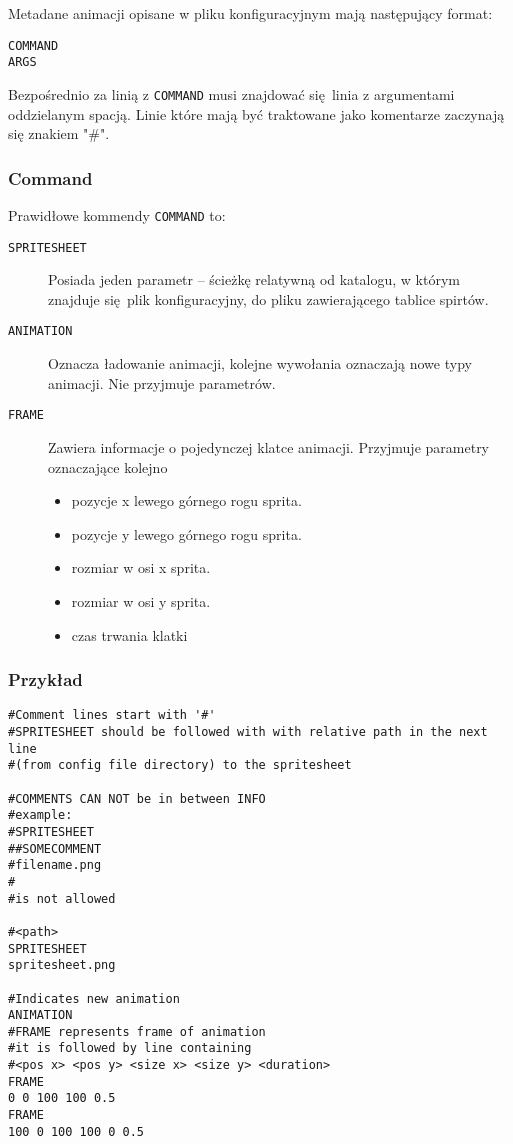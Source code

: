 \documentclass[11pt]{article}
\begin{document}
Metadane animacji opisane w pliku konfiguracyjnym mają następujący format:

\begin{verbatim}
COMMAND
ARGS
\end{verbatim}

Bezpośrednio za linią z \texttt{COMMAND} musi znajdować się linia z argumentami oddzielanym spacją.
Linie które mają być traktowane jako komentarze zaczynają się znakiem "\#".
\subsubsection{Command}
\label{sec:orgd1df8d0}

Prawidłowe kommendy \texttt{COMMAND} to:
\begin{description}
\item[{\texttt{SPRITESHEET}}] Posiada jeden parametr -- ścieżkę relatywną od katalogu, w którym znajduje się plik konfiguracyjny, do pliku zawierającego tablice spirtów.

\item[{\texttt{ANIMATION}}] Oznacza ładowanie animacji, kolejne wywołania oznaczają nowe typy animacji. Nie przyjmuje parametrów.

\item[{\texttt{FRAME}}] Zawiera informacje o pojedynczej klatce animacji.
Przyjmuje parametry oznaczające kolejno
\begin{itemize}
\item pozycje x lewego górnego rogu sprita.
\item pozycje y lewego górnego rogu sprita.
\item rozmiar w osi x sprita.
\item rozmiar w osi y sprita.
\item czas trwania klatki
\end{itemize}
\end{description}
\subsubsection{Przykład}
\label{sec:org9096b63}
\begin{verbatim}
#Comment lines start with '#'
#SPRITESHEET should be followed with with relative path in the next line
#(from config file directory) to the spritesheet

#COMMENTS CAN NOT be in between INFO
#example:
#SPRITESHEET
##SOMECOMMENT
#filename.png
#
#is not allowed

#<path>
SPRITESHEET
spritesheet.png

#Indicates new animation
ANIMATION
#FRAME represents frame of animation
#it is followed by line containing
#<pos x> <pos y> <size x> <size y> <duration>
FRAME
0 0 100 100 0.5
FRAME
100 0 100 100 0 0.5
\end{verbatim}
\end{document}
